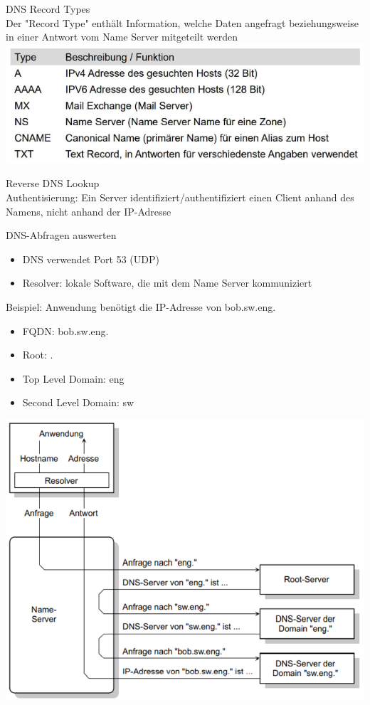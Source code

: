 \begin{definition}{DNS Record Types}\\
    Der "Record Type" enthält Information, welche Daten angefragt beziehungsweise in einer
    Antwort vom Name Server mitgeteilt werden\\
    \includegraphics[width=1\linewidth]{images/dns_record_types.png}
\end{definition}

\begin{definition}{Reverse DNS Lookup}\\
    Authentisierung: Ein Server identifiziert/authentifiziert einen Client anhand des Namens, nicht anhand der IP-Adresse
\end{definition}

\begin{example2}{DNS-Abfragen auswerten}
    \begin{itemize}
        \item DNS verwendet Port 53 (UDP)
        \item Resolver: lokale Software, die mit dem Name Server kommuniziert
    \end{itemize}
    Beispiel: Anwendung benötigt die IP-Adresse von bob.sw.eng.
    \begin{itemize}
        \item FQDN: bob.sw.eng. 
        \item Root: .
        \item Top Level Domain: eng
        \item Second Level Domain: sw
    \end{itemize}
        \includegraphics[width=1\linewidth]{images/example_dns.png}        
\end{example2}

